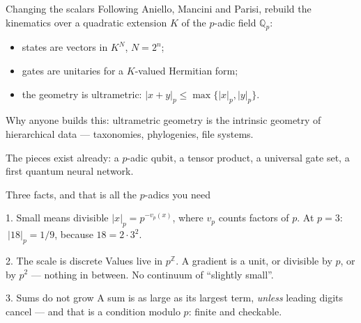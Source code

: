 \documentclass[aspectratio=169,10pt]{beamer}
\newcommand{\Qp}{\mathbb{Q}_p}
\newcommand{\padicnorm}[1]{\left|#1\right|_p}
\begin{document}
\begin{frame}{Changing the scalars}
  Following Aniello, Mancini and Parisi, rebuild the kinematics over a
  quadratic extension $K$ of the $p$-adic field $\Qp$:

  \vspace{0.4em}
  \begin{itemize}
    \item states are vectors in $K^{N}$, $N=2^{n}$;
    \item gates are unitaries for a $K$-valued Hermitian form;
    \item the geometry is \alert{ultrametric}:
      $\padicnorm{x+y}\le\max\{\padicnorm{x},\padicnorm{y}\}$.
  \end{itemize}

  \vspace{0.6em}
  Why anyone builds this: ultrametric geometry is the intrinsic geometry of
  \alert{hierarchical data} --- taxonomies, phylogenies, file systems.

  \vspace{0.4em}
  The pieces exist already: a $p$-adic qubit, a tensor product, a universal
  gate set, a first quantum neural network.
\end{frame}

\begin{frame}{Three facts, and that is all the $p$-adics you need}
  \begin{block}{1. Small means divisible}
    $\padicnorm{x}=p^{-v_p(x)}$, where $v_p$ counts factors of $p$.
    At $p=3$: $\ \padicnorm{18}=1/9$, because $18=2\cdot3^{2}$.
  \end{block}

  \begin{block}{2. The scale is discrete}
    Values live in $p^{\mathbb{Z}}$. A gradient is a unit, or divisible by $p$,
    or by $p^{2}$ --- nothing in between. No continuum of ``slightly small''.
  \end{block}

  \begin{block}{3. Sums do not grow}
    A sum is as large as its largest term, \emph{unless} leading digits cancel
    --- and that is a condition modulo $p$: finite and checkable.
  \end{block}
\end{frame}
\end{document}

